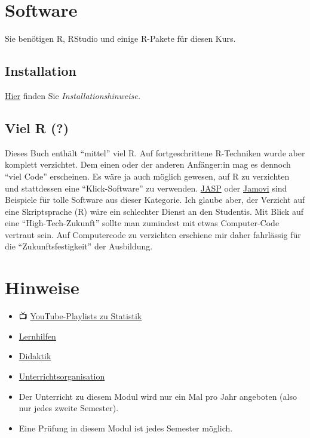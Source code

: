 \documentclass[
  a4paper,
  DIV=11]{scrreprt}
\theoremstyle{definition}
\theoremstyle{definition}
\theoremstyle{definition}
\theoremstyle{remark}
\begin{document}
\section{Software}\label{software}

Sie benötigen R, RStudio und einige R-Pakete für diesen Kurs.

\subsection{Installation}\label{installation}

\href{https://hinweisbuch.netlify.app/hinweise-software}{Hier} finden
Sie \emph{Installationshinweise.}

\subsection{Viel R (?)}\label{viel-r}

Dieses Buch enthält ``mittel'' viel R. Auf fortgeschrittene R-Techniken
wurde aber komplett verzichtet. Dem einen oder der anderen Anfänger:in
mag es dennoch ``viel Code'' erscheinen. Es wäre ja auch möglich
gewesen, auf R zu verzichten und stattdessen eine ``Klick-Software'' zu
verwenden. \href{https://jasp-stats.org/}{JASP} oder
\href{https://www.jamovi.org/}{Jamovi} sind Beispiele für tolle Software
aus dieser Kategorie. Ich glaube aber, der Verzicht auf eine
Skriptsprache (R) wäre ein schlechter Dienst an den Studentis. Mit Blick
auf eine ``High-Tech-Zukunft'' sollte man zumindest mit etwas
Computer-Code vertraut sein. Auf Computercode zu verzichten erschiene
mir daher fahrlässig für die ``Zukunftsfestigkeit'' der Ausbildung.

\section{Hinweise}\label{hinweise}

\begin{itemize}
\item
  📺
  \href{https://www.youtube.com/channel/UCkvdtj8maE7g-SOCh4aDB9g}{YouTube-Playlists
  zu Statistik}
\item
  \href{https://hinweisbuch.netlify.app/hinweise-lernhilfen-frame}{Lernhilfen}
\item
  \href{https://hinweisbuch.netlify.app/hinweise-didaktik-frame}{Didaktik}
\item
  \href{https://hinweisbuch.netlify.app/hinweise-unterricht-frame}{Unterrichtsorganisation}
\item
  Der Unterricht zu diesem Modul wird nur ein Mal pro Jahr angeboten
  (also nur jedes zweite Semester).
\item
  Eine Prüfung in diesem Modul ist jedes Semester möglich.
\end{itemize}
\end{document}
